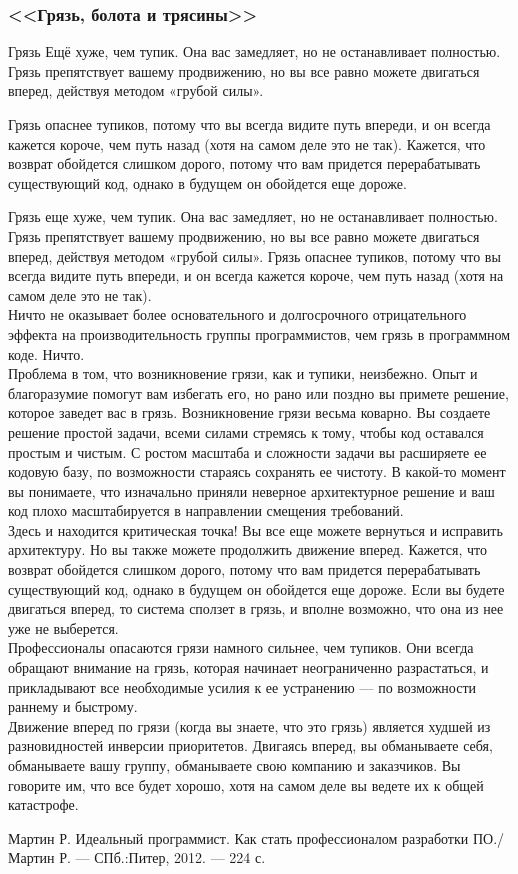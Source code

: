 \documentclass{../industrial-development}
\begin{document}
\begin{frame} \frametitle{<<Грязь, болота и трясины>>}
\begin{block}{Грязь}
Ещё хуже, чем тупик. Она вас замедляет, но не останавливает полностью. Грязь препятствует вашему продвижению, но вы все равно можете двигаться вперед, действуя методом «грубой силы». 
\end{block}
Грязь опаснее тупиков, потому что вы всегда видите путь впереди, и он всегда кажется короче, чем путь назад (хотя на самом деле это не так). Кажется, что возврат обойдется слишком дорого, потому что вам придется перерабатывать существующий код, однако в будущем он обойдется еще дороже.
\end{frame}
\lecturenotes
Грязь еще хуже, чем тупик. Она вас замедляет, но не останавливает полностью. Грязь препятствует вашему продвижению, но вы все равно можете двигаться вперед, действуя методом «грубой силы». Грязь опаснее тупиков, потому что вы всегда видите путь впереди, и он всегда кажется короче, чем путь назад (хотя на самом деле это не так).\\
Ничто не оказывает более основательного и долгосрочного отрицательного эффекта на производительность группы программистов, чем грязь в программном коде. Ничто.\\
Проблема в том, что возникновение грязи, как и тупики, неизбежно. Опыт и благоразумие помогут вам избегать его, но рано или поздно вы примете решение, которое заведет вас в грязь. Возникновение грязи весьма коварно. Вы создаете решение простой задачи, всеми силами стремясь к тому, чтобы код оставался простым и чистым. С ростом масштаба и сложности задачи вы расширяете ее кодовую базу, по возможности стараясь сохранять ее чистоту. В какой-то момент вы понимаете, что изначально приняли неверное архитектурное решение и ваш код плохо масштабируется в направлении смещения требований.\\
Здесь и находится критическая точка! Вы все еще можете вернуться и исправить архитектуру. Но вы также можете продолжить движение вперед. Кажется, что возврат обойдется слишком дорого, потому что вам придется перерабатывать существующий код, однако в будущем он обойдется еще дороже. Если вы будете двигаться вперед, то система сползет в грязь, и вполне возможно, что она из нее уже не выберется.\\
Профессионалы опасаются грязи намного сильнее, чем тупиков. Они всегда обращают внимание на грязь, которая начинает неограниченно разрастаться, и прикладывают все необходимые усилия к ее устранению — по возможности раннему и быстрому.\\
Движение вперед по грязи (когда вы знаете, что это грязь) является худшей из разновидностей инверсии приоритетов. Двигаясь вперед, вы обманываете себя, обманываете вашу группу, обманываете свою компанию и заказчиков. Вы говорите им, что все будет хорошо, хотя на самом деле вы ведете их к общей катастрофе.

\begin{thebibliography}{99}
 {Мартин Р. Идеальный программист. Как стать профессионалом разработки ПО./Мартин Р. — СПб.:Питер, 2012. — 224 с.}
\end{thebibliography}
\end{document}
